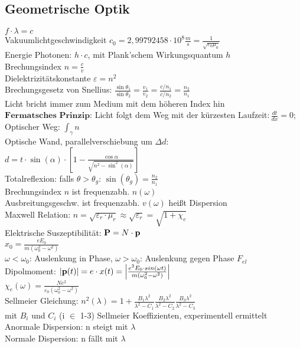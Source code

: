 \documentclass[fs, footer]{latex4ei}
\begin{document}
\begin{multicols*}{4}
\subsection{Geometrische Optik}
$f\cdot\lambda = c$\\
Vakuumlichtgeschwindigkeit $c_0=2,99792458\cdot 10^8 \frac{m}{s} = \frac{1}{\sqrt{\varepsilon_0 \mu_0}}$\\
Energie Photonen: $h\cdot c$, mit Plank'schem Wirkungsquantum $h$\\
Brechungsindex $n = \frac{c}{v}$\\
Dielektrizitätskonstante $\varepsilon = n^2 $\\
 Brechungsgesetz von Snellius: $\frac{\sin\theta_1}{\sin\theta_2} = \frac{v_1}{v_2}  = \frac{c/n_1}{c/n_2} = \frac{n_2}{n_1}$\\
Licht bricht immer zum Medium mit dem höheren Index hin\\
$\textbf{Fermatsches Prinzip}$: Licht folgt dem Weg mit der kürzesten Laufzeit$: \frac{dt}{dx} = 0$; Optischer Weg: $\int_{\gamma}n$\\
Optische Wand, parallelverschiebung um $\Delta d:$\\$d = t\cdot\sin(\alpha)\cdot\left[1-\frac{\cos\alpha}{\sqrt{n^2- \sin ^2(\alpha)}}\right]$\\
Totalreflexion: falls $\theta>\theta_g$: $\sin(\theta_g) = \frac{n_2}{n_1}$\\

Brechungsindex $n$ ist frequenzabh. $n(\omega)$\\
Ausbreitungsgeschw. ist frequenzabh. $v(\omega)$ heißt Dispersion\\
Maxwell Relation: $n = \sqrt{\varepsilon_r\cdot \mu_r} \approx \sqrt{\varepsilon_r} = \sqrt{1+\chi_e}$\\ %
Elektrische Suszeptibilität: $\textbf{P} = N \cdot \textbf{p}$\\%
$x_0 = \frac{eE_0}{m(\omega_0^2-\omega^2)}$\\
$\omega < \omega_0$: Auslenkung in Phase,
$\omega > \omega_0$: Auslenkung gegen Phase $F_{el}$\\
Dipolmoment: $|\textbf{p}(t)| = e\cdot x(t) = \left|\frac{e^2E_0\cdot sin(\omega t)}{m(\omega_0^2-\omega^2)}\right|$\\ %
$\chi _e(\omega) = \frac{Ne^2}{\varepsilon_0(\omega_0^2 - \omega^2)}$\\
Sellmeier Gleichung: $n^2(\lambda) = 1 + \frac{B_1\lambda^2}{\lambda^2-C_1}\frac{B_2\lambda^2}{\lambda^2-C_2}\frac{B_3\lambda^2}{\lambda^2-C_3}$\\ mit $B_i$ und $C_i$ (i $\in$ 1-3) Sellmeier Koeffizienten, experimentell ermittelt\\
Anormale Dispersion: n steigt mit $\lambda$\\
Normale Dispersion: n fällt mit $\lambda$\\

\end{multicols*}
\end{document}
